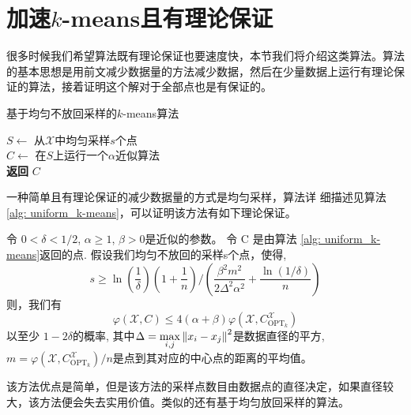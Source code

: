 \section{加速\texorpdfstring{$k$}{k}-means且有理论保证}
很多时候我们希望算法既有理论保证也要速度快，本节我们将介绍这类算法。算法的基本思想是用前文减少数据量的方法减少数据，然后在少量数据上运行有理论保证的算法，接着证明这个解对于全部点也是有保证的。
\begin{algorithm}
    \caption{基于均匀不放回采样的$k$-means算法}\label{alg: uniform_k-means}
    $S \gets$ 从$\mathcal{X}$中均匀采样$s$个点\\
    $C \gets$ 在$S$上运行一个$\alpha$近似算法\\
    \textbf{返回} $C$
\end{algorithm}
一种简单且有理论保证的减少数据量的方式是均匀采样，算法详
细描述见算法\ref{alg: uniform_k-means}，可以证明该方法有如下理论保证。
\begin{theorem}[均匀不放回采样的解的质量]
    \label{theo: uniform_k-means}
    令 $0 < \delta <1/2$, $\alpha \geq 1$, $\beta >0$是近似的参数。 令 C 是由算法 \ref{alg: uniform_k-means}返回的点. 假设我们均匀不放回的采样s个点，使得,
    \begin{equation*}
    s \geq \ln(\frac{1}{\delta})(1+\frac{1}{n})/(\frac{\beta^2 m^2}{2\Delta^2 \alpha^2}+\frac{\ln(1/\delta)}{n})
    \end{equation*}
    则，我们有
    \begin{equation*}
    \varphi(\mathcal{X},C) \leq 4(\alpha + \beta)\varphi(\mathcal{X},C_{\text{OPT}_k}^{\mathcal{X}})
    \end{equation*}
    以至少 $1-2\delta$的概率, 其中$\Delta = \max\limits_{i,j}\left\lVert x_i - x_j\right\rVert^2$是数据直径的平方, $m = \varphi(\mathcal{X},C_{\text{OPT}_k}^{\mathcal{X}})/n$是点到其对应的中心点的距离的平均值。
\end{theorem}
该方法优点是简单，但是该方法的采样点数目由数据点的直径决定，如果直径较大，该方法便会失去实用价值。类似的还有基于均匀放回采样的算法。

